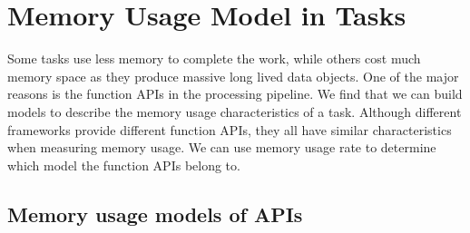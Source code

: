 \section{Memory Usage Model in Tasks}



Some tasks use less memory to complete the work, while others cost much memory space as they produce massive long lived data objects. One of the major reasons is the function APIs in the processing pipeline. We find that we can build models to describe the memory usage characteristics of a task. Although different frameworks provide different function APIs, they all have similar characteristics when measuring memory usage. We can use memory usage rate to determine which model the function APIs belong to.


\subsection{Memory usage models of APIs}

